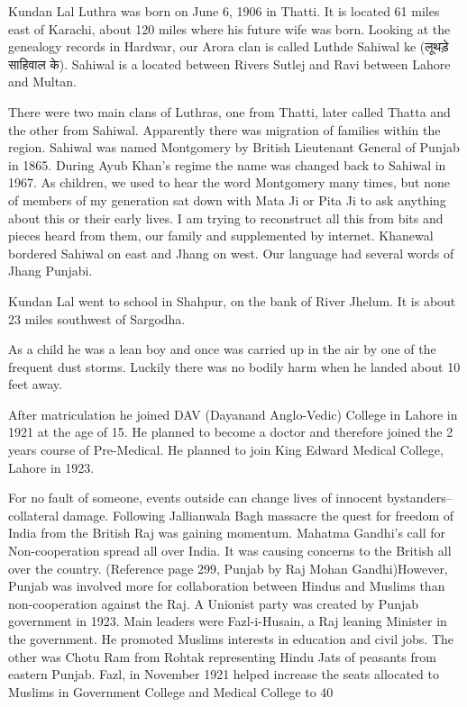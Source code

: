 Kundan Lal Luthra was born on June 6, 1906 in Thatti. It is located 61 miles east of Karachi, about 120 miles where his future wife was born. Looking at the genealogy records in Hardwar, our Arora clan is called Luthde Sahiwal ke (लूथड़े साहिवाल के). 
Sahiwal is a located between Rivers Sutlej and Ravi between Lahore and Multan. 

There were two main clans of Luthras, one from Thatti, later called Thatta and the other from Sahiwal. Apparently there was migration of families within the region. Sahiwal was named Montgomery by British Lieutenant General of Punjab in 1865. During Ayub Khan’s regime the name was changed back to Sahiwal in 1967. As children, we used to hear the word Montgomery many times, but none of members of my generation sat down with Mata Ji or Pita Ji to ask anything about this or their early lives. I am trying to reconstruct all this from bits and pieces heard from them, our family and supplemented by internet. 
Khanewal bordered Sahiwal on east and Jhang on west. Our language had several words of Jhang Punjabi. 

Kundan Lal went to school in Shahpur, on the bank of River Jhelum. It is about 23 miles southwest of Sargodha. 

As a child he was a lean boy and once was carried up in the air by one of the frequent dust storms. Luckily there was no bodily harm when he landed about 10 feet away. 

After matriculation he joined DAV (Dayanand Anglo-Vedic) College in Lahore in 1921 at the age of 15. He planned to become a doctor and therefore joined the 2 years course of Pre-Medical. He planned to join King Edward Medical College, Lahore in 1923. 

For no fault of someone, events outside can change lives of innocent bystanders--collateral damage. Following Jallianwala Bagh massacre the quest for freedom of India from the British Raj was gaining momentum. Mahatma Gandhi’s call for Non-cooperation spread all over India. It was causing concerns to the British all over the country. 
(Reference page 299, Punjab by Raj Mohan Gandhi)However, Punjab was involved more for collaboration between Hindus and Muslims than non-cooperation against the Raj. A Unionist party was created by Punjab government in 1923. Main leaders were Fazl-i-Husain, a Raj leaning Minister in the government. He promoted Muslims interests in education and civil jobs. The other was Chotu Ram from Rohtak representing Hindu Jats of peasants from eastern Punjab. 
Fazl, in November 1921 helped increase the seats allocated to Muslims in Government College and Medical College to 40%

